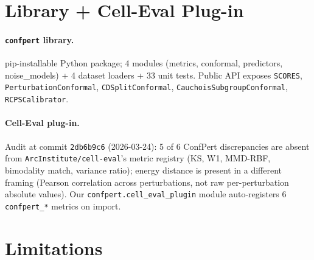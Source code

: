 \documentclass{article}
\begin{document}
\section{Library + Cell-Eval Plug-in}

\paragraph{\texttt{confpert} library.} pip-installable Python package; 4 modules (metrics, conformal, predictors, noise\_models) + 4 dataset loaders + 33 unit tests. Public API exposes \texttt{SCORES}, \texttt{PerturbationConformal}, \texttt{CDSplitConformal}, \texttt{CauchoisSubgroupConformal}, \texttt{RCPSCalibrator}.

\paragraph{Cell-Eval plug-in.} Audit at commit \texttt{2db6b9c6} (2026-03-24): 5 of 6 ConfPert discrepancies are absent from \texttt{ArcInstitute/cell-eval}'s metric registry (KS, W1, MMD-RBF, bimodality match, variance ratio); energy distance is present in a different framing (Pearson correlation across perturbations, not raw per-perturbation absolute values). Our \texttt{confpert.cell\_eval\_plugin} module auto-registers 6 \texttt{confpert\_*} metrics on import.

\section{Limitations}
\end{document}
